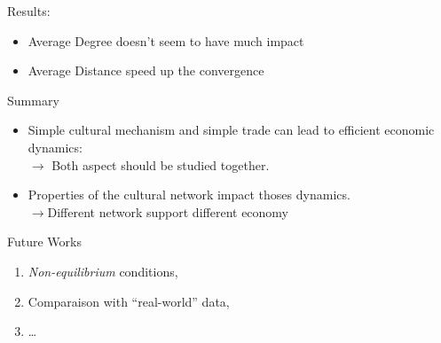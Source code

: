 \documentclass[12pt, notes=show]{beamer}
\begin{document}
	\begin{frame}{Results: }
		\begin{itemize}
				\vfill
			\item Average Degree doesn't seem to have much impact
				\vfill
			\item Average Distance speed up the convergence
		\end{itemize}

	\end{frame}



	\begin{frame}{Summary}
		\begin{itemize}
			\item Simple cultural mechanism and simple trade can lead to efficient economic dynamics:\\
				{$\rightarrow$ \small Both aspect should be studied together.}
				\vfill
			\item Properties of the cultural network impact thoses dynamics.\\
				{$\rightarrow$\small Different network support different economy}
				\vfill
		\end{itemize}

	\end{frame}
	\begin{frame}{Future Works}

		\begin{enumerate}
			\item \emph{Non-equilibrium} conditions,
			\item Comparaison with ``real-world'' data,
			\item \dots
		\end{enumerate}
	\end{frame}
\end{document}
